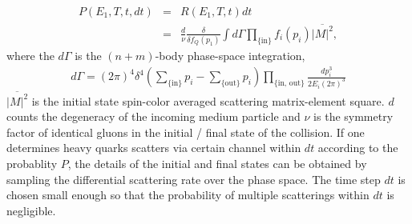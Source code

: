 \documentclass[aps, prc, reprint, amsmath, groupedaddress, nofootinbib]{revtex4-1}
\begin{document}
\begin{eqnarray}\label{eq:rate}
    P(E_1,T,t,dt) &=& R(E_1, T, t) dt \\
    &=& \frac{d}{\nu} \frac{\delta}{\delta f_Q(p_1)}\int d \Gamma \prod_{\textrm{\{in\}}} f_i(p_i) 
\overline{|M|^2},
  	 \nonumber
\end{eqnarray}
where the $d\Gamma$ is the $(n+m)$-body phase-space integration,
\begin{eqnarray}
\nonumber
d\Gamma = (2\pi)^4\delta^4\left(\sum_{\textrm{\{in\}}}p_{i} - \sum_{\textrm{\{out\}}}p_{i}\right)\prod_{\{\textrm{in, out}\}} \frac{dp_i^3}{2E_i(2\pi)^3} 
\end{eqnarray}
$\overline{|M|^2}$ is the initial state spin-color averaged scattering matrix-element square.
$d$ counts the degeneracy of the incoming medium particle and $\nu$ is the symmetry factor of identical gluons in the initial / final state of the collision.
If one determines heavy quarks scatters via certain channel within $dt$ according to the probablity $P$, the details of the initial and final states can be obtained by sampling the differential scattering rate over the phase space.
The time step $dt$ is chosen small enough so that the probability of multiple scatterings within $dt$ is negligible. 
\end{document}
